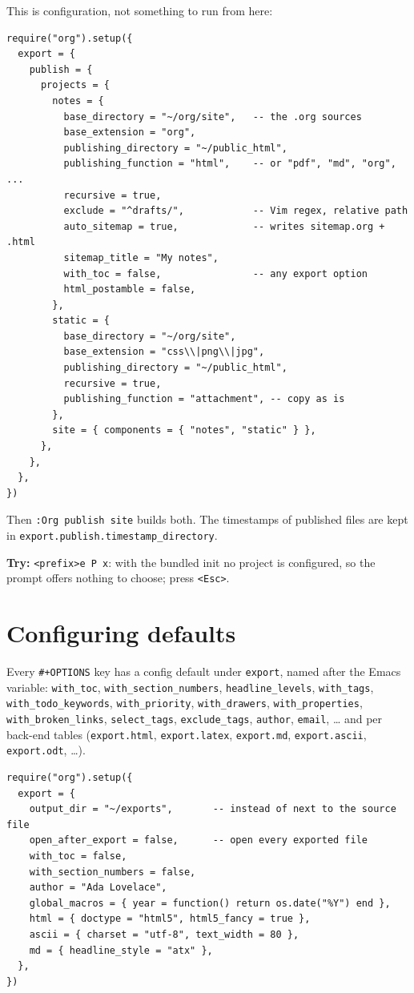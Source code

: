 This is configuration, not something to run from here:

\begin{verbatim}
require("org").setup({
  export = {
    publish = {
      projects = {
        notes = {
          base_directory = "~/org/site",   -- the .org sources
          base_extension = "org",
          publishing_directory = "~/public_html",
          publishing_function = "html",    -- or "pdf", "md", "org", ...
          recursive = true,
          exclude = "^drafts/",            -- Vim regex, relative path
          auto_sitemap = true,             -- writes sitemap.org + .html
          sitemap_title = "My notes",
          with_toc = false,                -- any export option
          html_postamble = false,
        },
        static = {
          base_directory = "~/org/site",
          base_extension = "css\\|png\\|jpg",
          publishing_directory = "~/public_html",
          recursive = true,
          publishing_function = "attachment", -- copy as is
        },
        site = { components = { "notes", "static" } },
      },
    },
  },
})
\end{verbatim}

Then \texttt{:Org publish site} builds both. The timestamps of published files
are kept in \texttt{export.publish.timestamp\_directory}.

\textbf{Try:} \texttt{<prefix>e P x}: with the bundled init no project is configured, so
the prompt offers nothing to choose; press \texttt{<Esc>}.
\section{Configuring defaults}
\label{sec:org848e160}
Every \texttt{\#+OPTIONS} key has a config default under \texttt{export}, named after the
Emacs variable: \texttt{with\_toc}, \texttt{with\_section\_numbers}, \texttt{headline\_levels},
\texttt{with\_tags}, \texttt{with\_todo\_keywords}, \texttt{with\_priority}, \texttt{with\_drawers},
\texttt{with\_properties}, \texttt{with\_broken\_links}, \texttt{select\_tags}, \texttt{exclude\_tags},
\texttt{author}, \texttt{email}, \ldots{} and per back-end tables (\texttt{export.html},
\texttt{export.latex}, \texttt{export.md}, \texttt{export.ascii}, \texttt{export.odt}, \ldots{}).

\begin{verbatim}
require("org").setup({
  export = {
    output_dir = "~/exports",       -- instead of next to the source file
    open_after_export = false,      -- open every exported file
    with_toc = false,
    with_section_numbers = false,
    author = "Ada Lovelace",
    global_macros = { year = function() return os.date("%Y") end },
    html = { doctype = "html5", html5_fancy = true },
    ascii = { charset = "utf-8", text_width = 80 },
    md = { headline_style = "atx" },
  },
})
\end{verbatim}

